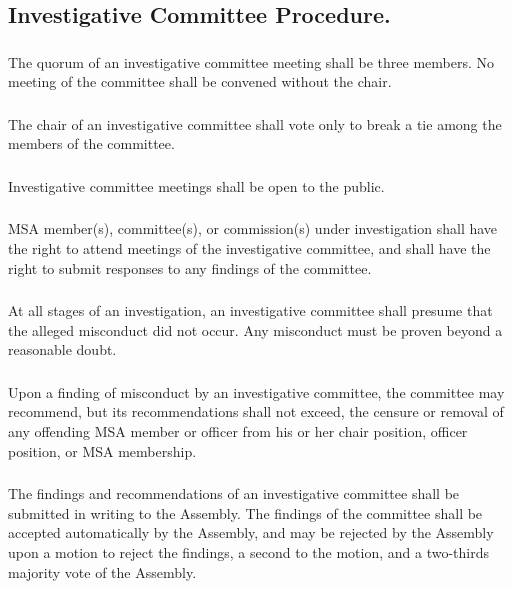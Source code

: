 \subsection{Investigative Committee Procedure.}

\subsubsection{}
The quorum of an investigative committee meeting shall be three members.  No meeting of the committee shall be convened without the chair.

\subsubsection{}
The chair of an investigative committee shall vote only to break a tie among the members of the committee.

\subsubsection{}
Investigative committee meetings shall be open to the public.

\subsubsection{}
MSA member(s), committee(s), or commission(s) under investigation shall have the right to attend meetings of the investigative committee, and shall have the right to submit responses to any findings of the committee.

\subsubsection{}
At all stages of an investigation, an investigative committee shall presume that the alleged misconduct did not occur.  Any misconduct must be proven beyond a reasonable doubt.

\subsubsection{}
Upon a finding of misconduct by an investigative committee, the committee may recommend, but its recommendations shall not exceed, the censure or removal of any offending MSA member or officer from his or her chair position, officer position, or MSA membership.

\subsubsection{}
The findings and recommendations of an investigative committee shall be submitted in writing to the Assembly.  The findings of the committee shall be accepted automatically by the Assembly, and may be rejected by the Assembly upon a motion to reject the findings, a second to the motion, and a two-thirds majority vote of the Assembly.

